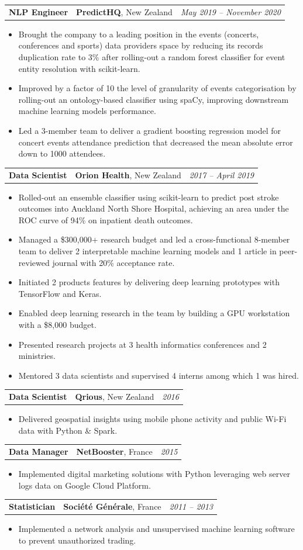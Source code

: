 \documentclass[letterpaper,11pt]{article}
\newcommand{\resumeItemListStart}{\begin{itemize}[label=$\circ$, topsep=0.1cm, parsep=0cm, partopsep=0cm, itemsep=0.1cm, leftmargin=0.4cm]}
\newcommand{\resumeItem}[1]{\item\small{#1}}
\newcommand{\resumeJustifiedItem}[1]{\item\begin{justify}\small{#1}\end{justify}}
\newcommand{\resumeItemListEnd}{\end{itemize}}
\newcommand{\job}[4]{
    \begin{tabular}{p{7cm}p{6cm}p{5cm}}
      \hspace{-0.7em} \textbf{#1} & \textbf{\small{#2}}\scriptsize{, #3} & \hfill \textit{\small{#4}}
    \end{tabular}
}
\begin{document}
\job {NLP Engineer}{PredictHQ}{New Zealand}{May 2019 -- November 2020}
\resumeItemListStart
\resumeJustifiedItem {Brought the company to a leading position in the events (concerts, conferences and sports) data providers space by reducing its records duplication rate to 3\% after rolling-out a random forest classifier for event entity resolution with scikit-learn.}
\resumeJustifiedItem {Improved by a factor of 10 the level of granularity of events categorisation by rolling-out an ontology-based classifier using spaCy, improving downstream machine learning models performance.}
\resumeJustifiedItem {Led a 3-member team to deliver a gradient boosting regression model for concert events attendance prediction that decreased the mean absolute error down to 1000 attendees.}
\resumeItemListEnd \vspace{0.2cm}
	
\job {Data Scientist}{Orion Health}{New Zealand}{2017 -- April 2019}
\resumeItemListStart
\resumeJustifiedItem {Rolled-out an ensemble classifier using scikit-learn to predict post stroke outcomes into Auckland North Shore Hospital, achieving an area under the ROC curve of 94\% on inpatient death outcomes.}
\resumeJustifiedItem {Managed a \$300,000+ research budget and led a cross-functional 8-member team to deliver 2 interpretable machine learning models and 1 article in peer-reviewed journal with 20\% acceptance rate.}
\resumeItem {Initiated 2 products features by delivering deep learning prototypes with TensorFlow and Keras.}
\resumeItem {Enabled deep learning research in the team by building a GPU workstation with a \$8,000 budget.}
\resumeItem {Presented research projects at 3 health informatics conferences and 2 ministries.}
\resumeItem {Mentored 3 data scientists and supervised 4 interns among which 1 was hired.}
\resumeItemListEnd \vspace{0.2cm}

\job {Data Scientist}{Qrious}{New Zealand}{2016}
\resumeItemListStart
\resumeItem {Delivered geospatial insights using mobile phone activity and public Wi-Fi data with Python \& Spark.}
\resumeItemListEnd \vspace{0.2cm}

\job {Data Manager}{NetBooster}{France}{2015}
\resumeItemListStart
\resumeItem {Implemented digital marketing solutions with Python leveraging web server logs data on Google Cloud Platform.}
\resumeItemListEnd \vspace{0.2cm}

\job {Statistician}{Société Générale}{France}{2011 -- 2013}
\resumeItemListStart
\resumeItem {Implemented a network analysis and unsupervised machine learning software to prevent unauthorized trading.}
\resumeItemListEnd 
\end{document}
